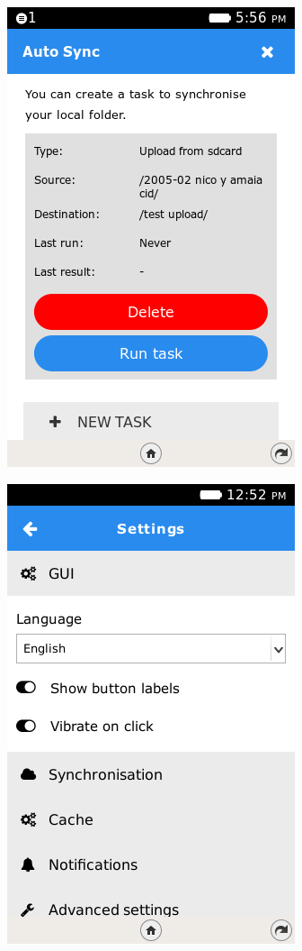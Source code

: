 \documentclass{beamer}
\begin{document}
\begin{frame}
\begin{center}
\includegraphics[scale=0.5] {./images/TFEDrive08.png} 
\end{center}
\end{frame}

\begin{frame}
\begin{center}
\includegraphics[scale=0.5] {./images/TFEDrive09.png} 
\end{center}
\end{frame}
\end{document}

